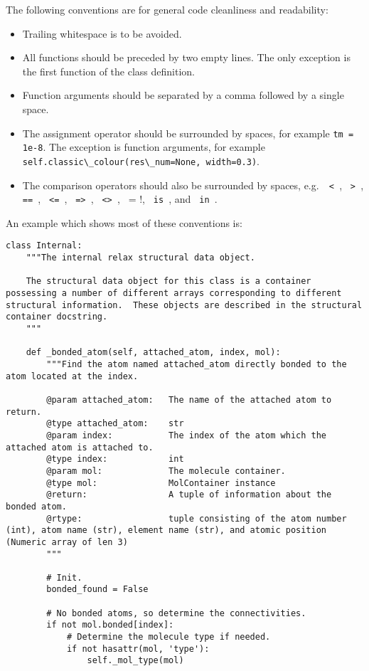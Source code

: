 The following conventions are for general code cleanliness and readability:
\begin{itemize}
  \item Trailing whitespace is to be avoided.
  \item All functions should be preceded by two empty lines.
    The only exception is the first function of the class definition.
  \item Function arguments should be separated by a comma followed by a single space.
  \item The assignment operator should be surrounded by spaces, for example \verb*!tm = 1e-8!.
    The exception is function arguments, for example \verb*!self.classic\_colour(res\_num=None, width=0.3)!.
  \item The comparison operators should also be surrounded by spaces, e.g.\ \verb*! < !, \verb*! > !, \verb*! == !, \verb*! <= !, \verb*! => !, \verb*! <> !, \verb*! != !, \verb*! is !, and \verb*! in !.
\end{itemize}

An example which shows most of these conventions is:
\begin{lstlisting}
class Internal:
    """The internal relax structural data object.

    The structural data object for this class is a container possessing a number of different arrays corresponding to different structural information.  These objects are described in the structural container docstring.
    """

    def _bonded_atom(self, attached_atom, index, mol):
        """Find the atom named attached_atom directly bonded to the atom located at the index.

        @param attached_atom:   The name of the attached atom to return.
        @type attached_atom:    str
        @param index:           The index of the atom which the attached atom is attached to.
        @type index:            int
        @param mol:             The molecule container.
        @type mol:              MolContainer instance
        @return:                A tuple of information about the bonded atom.
        @rtype:                 tuple consisting of the atom number (int), atom name (str), element name (str), and atomic position (Numeric array of len 3)
        """

        # Init.
        bonded_found = False

        # No bonded atoms, so determine the connectivities.
        if not mol.bonded[index]:
            # Determine the molecule type if needed.
            if not hasattr(mol, 'type'):
                self._mol_type(mol)
\end{lstlisting}



